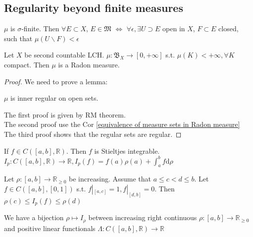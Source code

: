 \subsection{Regularity beyond finite measures}
\setcounter{theorem}{36}
\begin{theorem}
     $ \mu  $ is  $ \sigma $-finite. Then  $ \forall E\subset X  $,  $ E\in \mathfrak{M } $  $ \Leftrightarrow  $  $ \forall   \epsilon,   \exists U \supset E  $ open in  $ X  $,  $ F\subset E  $ closed, such that  $ \mu(U \backslash F)<\epsilon $ 
\end{theorem}
\begin{theorem}
    Let  $ X  $ be second countable LCH.  $ \mu:\mathfrak{B}_X \rightarrow [0,+\infty]$ s.t. $ \mu(K)<+\infty,\forall K  $ compact. Then  $ \mu  $ is a Radon measure. 
\end{theorem}
\begin{proof}
    We need to prove a lemma:
    \begin{lemma}
    $ \mu  $ is inner regular on open sets.
    \end{lemma}
    The first proof is given by RM theorem.\\
    The second proof use the Cor \ref{equivalence of measure sets in Radon measure}\\
    The third proof shows that the regular sets are regular.
\end{proof}
\begin{theorem}
    If  $ f\in C([a,b],\mathbb{R }) $. Then  $ f  $ is Stieltjes integrable.  $ I_p:C([a,b],\mathbb{R })\rightarrow \mathbb{R },I_p(f)=f(a)\rho (a)+\int_{a }^{b }f \mathrm{d}\rho $  
\end{theorem}
\begin{lemma}
    Let  $ \rho:[a,b]\rightarrow \mathbb{R }_{ \geq 0 } $ be increasing. Assume that  $ a \leq c<d \leq b  $. Let  $ f\in C([a,b],[0,1]) $ s.t.  $ f|_{[a,c]}=1, f|_{[d,b]}=0  $. Then  $ \rho(c) \leq I_p(f) \leq\rho(d) $ 
\end{lemma}
\begin{theorem}\label{Riesz Representation Theorem}
    We have a bijection  $ \rho \mapsto I_\rho $ between increasing right continuous  $ \rho:[a,b]\rightarrow \mathbb{R }_{ \geq 0 } $ and positive linear functionals  $ \Lambda:C([a,b],\mathbb{R})\rightarrow \mathbb{R } $  
\end{theorem}
